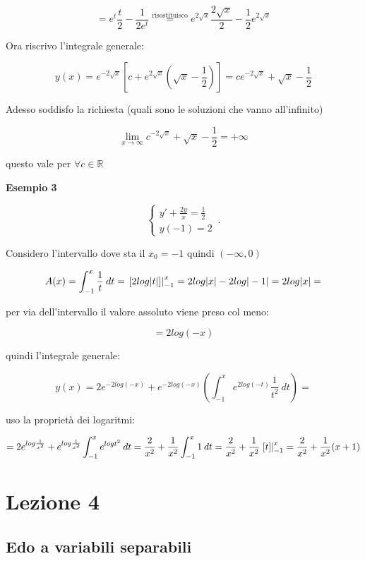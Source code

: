 \documentclass[11pt]{article}
\begin{document}
\[
    = e ^{t} \frac{t}{2} - \frac{1}{2 e ^{t}} 
    \overset{\text{risostituisco}}{=} e ^{2 \sqrt{x}} \frac{2 \sqrt{x}}{2} - \frac{1}{2} e ^{2 \sqrt{x}}
\]

Ora riscrivo l'integrale generale:

\[
    y(x) = e ^{-2 \sqrt{x}}[ c + e ^{2 \sqrt{x}}(\sqrt{x}- \frac{1}{2} )]= c e ^{-2 \sqrt{x}}+ \sqrt{x} - \frac{1}{2} 
\]

Adesso soddisfo la richiesta (quali sono le soluzioni che vanno all'infinito)

\[
    \lim_{x \to \infty} c ^{-2 \sqrt{x}} + \sqrt{x} - \frac{1}{2} = +\infty
\]

questo vale per $\forall c \in \mathbb{R}$


\textbf{Esempio 3}

\begin{equation}
    \begin{cases}
      y' + \frac{2y}{x} = \frac{1}{2} \\
      y(-1)=2
    \end{cases}\,.
\end{equation}

Considero l'intervallo dove sta il $x_0=-1$ quindi $(-\infty,0)$

\[
    A(x) = \int_{{-1}}^{{x}} {\frac{1}{t} } \: d{t} {} = \left.[2 log|t|]\right\rvert_{-1}^{x} = 2 log|x| - 2 log|-1| = 2 log|x| = 
\]

per via dell'intervallo il valore assoluto viene preso col meno:

\[
    =2 log(-x)  
\]

quindi l'integrale generale:

\[
    y(x) = 2 e ^{-2log(-x)}+ e^{-2log(-x)}(\int_{{-1}}^{{x}} {e ^{2log(-t)}\frac{1}{t ^{2}} } \: d{t} {})=
\]

uso la proprietà dei logaritmi:

\[
    = 2 e ^{log \frac{1}{x ^{2}} }+ e ^{log \frac{1}{x ^{2}} }\int_{{-1}}^{{x}} {e ^{log t ^{2}}} \: d{t} {}= \frac{2}{x ^{2}} + \frac{1}{x ^{2}} \int_{{-1}}^{{x}} {1} \: d{t} {} = \frac{2}{x ^{2}} + \frac{1}{x ^{2}} \left.[t]\right\rvert_{-1}^{x} 
     = \frac{2 }{x ^{2}} + \frac{1}{x ^{2}} (x+1)
\]



\newpage

\section{Lezione 4}

\subsection{Edo a variabili separabili}
\end{document}
